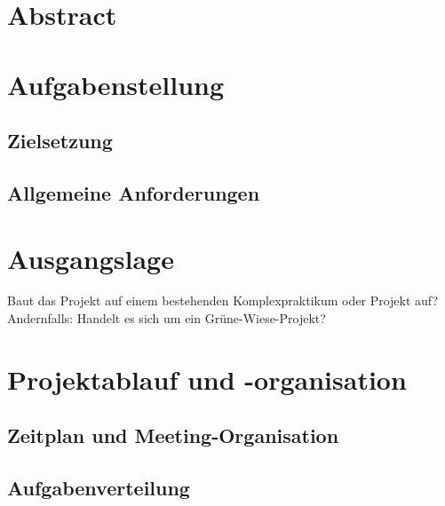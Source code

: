 \documentclass[
	11pt, 
	a4paper, 
	twoside, 
	openright, 
	titlepage=firstiscover, 
	numbers=noenddot, 
	BCOR=12mm,
	headsepline,
	footsepline,
	toc=listof,
	toc=bibliography
	]{scrbook}
\begin{document}

	
	
	
	
\cleardoublepage
{}
	
	\chapter*{Abstract}
	\Blindtext[1][2]
	
	\tableofcontents

\cleardoublepage
{} 

	\chapter{Aufgabenstellung}
	\section{Zielsetzung}
	\section{Allgemeine Anforderungen}
	
	\chapter{Ausgangslage}
	Baut das Projekt auf einem bestehenden Komplexpraktikum oder Projekt auf? Andernfalls: Handelt es sich um ein Grüne-Wiese-Projekt?
	
	\chapter{Projektablauf und -organisation}
	\section{Zeitplan und Meeting-Organisation}
	\section{Aufgabenverteilung}
\end{document}
